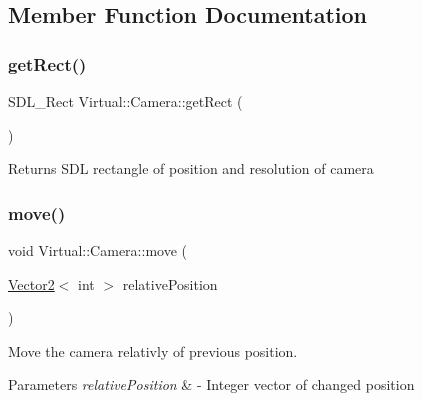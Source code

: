 \subsection{Member Function Documentation}
\hypertarget{class_virtual_1_1_camera_a45d86b427fa74b7c0bf2febe1d20cb01}{}\label{class_virtual_1_1_camera_a45d86b427fa74b7c0bf2febe1d20cb01} 
\subsubsection{\texorpdfstring{get\+Rect()}{getRect()}}
{\footnotesize\ttfamily S\+D\+L\+\_\+\+Rect Virtual\+::\+Camera\+::get\+Rect (\begin{DoxyParamCaption}{ }\end{DoxyParamCaption})}

\begin{DoxyReturn}{Returns}
S\+DL rectangle of position and resolution of camera 
\end{DoxyReturn}
\hypertarget{class_virtual_1_1_camera_ac6ec60ab0905c4ddcaa835914d20f770}{}\label{class_virtual_1_1_camera_ac6ec60ab0905c4ddcaa835914d20f770} 
\subsubsection{\texorpdfstring{move()}{move()}}
{\footnotesize\ttfamily void Virtual\+::\+Camera\+::move (\begin{DoxyParamCaption}\item[{\hyperlink{struct_virtual_1_1_vector2}{Vector2}$<$ int $>$}]{relative\+Position }\end{DoxyParamCaption})}



Move the camera relativly of previous position. 


\begin{DoxyParams}{Parameters}
{\em relative\+Position} & -\/ Integer vector of changed position \\
\hline
\end{DoxyParams}
\hypertarget{class_virtual_1_1_camera_ae6c71fea6b4f46be3af9c015507576a0}{}\label{class_virtual_1_1_camera_ae6c71fea6b4f46be3af9c015507576a0} 
